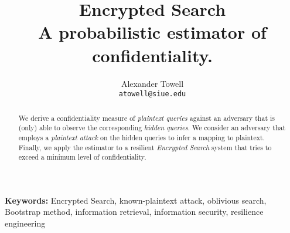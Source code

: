 \documentclass[hidelinks,final,11pt]{article}
\title
{
    Encrypted Search\\
    \large A probabilistic estimator of confidentiality.\\
}
\author
{
    Alexander Towell\\
    \texttt{atowell@siue.edu}
}
\date{}
\begin{document}
\maketitle
\begin{abstract}
We derive a confidentiality measure of \emph{plaintext queries} against an adversary that is (only) able to observe the corresponding \emph{hidden queries}. We consider an adversary that employs a \emph{plaintext attack} on the hidden queries to infer a mapping to plaintext. Finally, we apply the estimator to a resilient \emph{Encrypted Search} system that tries to exceed a minimum level of confidentiality.
\end{abstract}

\textbf{Keywords:}
Encrypted Search, known-plaintext attack, oblivious search, Bootstrap method, information retrieval, information security, resilience engineering

\tableofcontents
\printnomenclature









\listoffigures
\listofalgorithms

\end{document}
